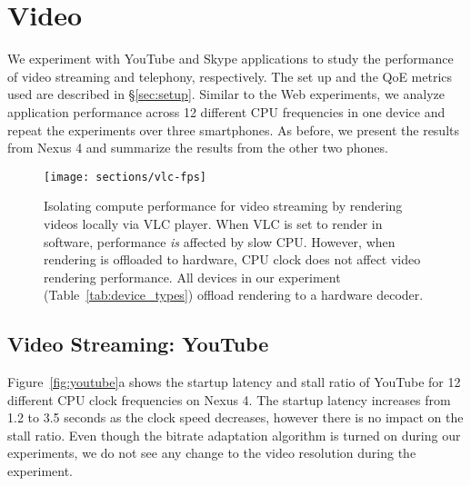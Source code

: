 
\section{Video} 
\label{label:video}

We experiment with YouTube and Skype applications to study the performance of video streaming and telephony, respectively. The set up and the QoE metrics used are described in \S\ref{sec:setup}. Similar to the Web experiments, we analyze application performance across 12 different CPU frequencies in one device and repeat the experiments over three smartphones. As before, we present the results from Nexus 4 and summarize the results from the other two phones.






\begin{figure}[t]
  \centering
  \texttt{[image: sections/vlc-fps]}
   \vspace{-0.1in}
     \caption{Isolating compute performance for video streaming by rendering videos locally via VLC player. When VLC is set to render in software, performance {\em is} affected by slow CPU. However, when  rendering is offloaded to hardware, CPU clock does not affect video rendering performance. All devices in our experiment (Table~\ref{tab:device_types}) offload rendering to a hardware decoder. }
   \vspace{-0.1in}
  \label{fig:vlc}
\end{figure}


\subsection{Video Streaming: YouTube}

Figure~\ref{fig:youtube}a shows the startup latency and stall ratio of YouTube for 12 different CPU clock frequencies on Nexus 4. 
The startup latency increases from 1.2 to 3.5 seconds as the clock speed decreases, however 
there is no impact on the stall ratio. Even though the bitrate adaptation algorithm is turned on during our experiments, we do not see any change to the video resolution during the experiment.

